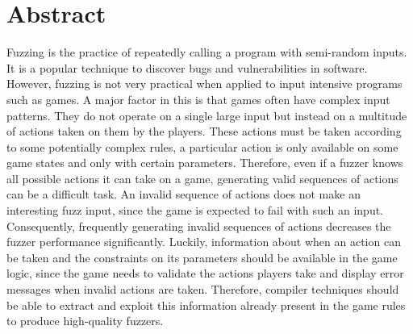 \documentclass{Configuration_Files/PoliMi3i_thesis}
\begin{document}


\pagestyle{empty} %
\frontmatter %


\pagebreak

\startpreamble
\setcounter{page}{1} %

\chapter*{Abstract} 
Fuzzing is the practice of repeatedly calling a program with semi-random inputs.
It is a popular technique to discover bugs and vulnerabilities in software.
However, fuzzing is not very practical when applied to input intensive programs such as games.
A major factor in this is that games often have complex input patterns.
They do not operate on a single large input but instead on a multitude of actions taken on them by the players.
These actions must be taken according to some potentially complex rules, a particular action is only available on some game states and only with certain parameters.
Therefore, even if a fuzzer knows all possible actions it can take on a game, generating valid sequences of actions can be a difficult task.
An invalid sequence of actions does not make an interesting fuzz input, since the game is expected to fail with such an input.
Consequently, frequently generating invalid sequences of actions decreases the fuzzer performance significantly.
Luckily, information about when an action can be taken and the constraints on its parameters should be available in the game logic, since the game needs to validate the actions players take and display error messages when invalid actions are taken.
Therefore, compiler techniques should be able to extract and exploit this information already present in the game rules to produce high-quality fuzzers.
\end{document}
